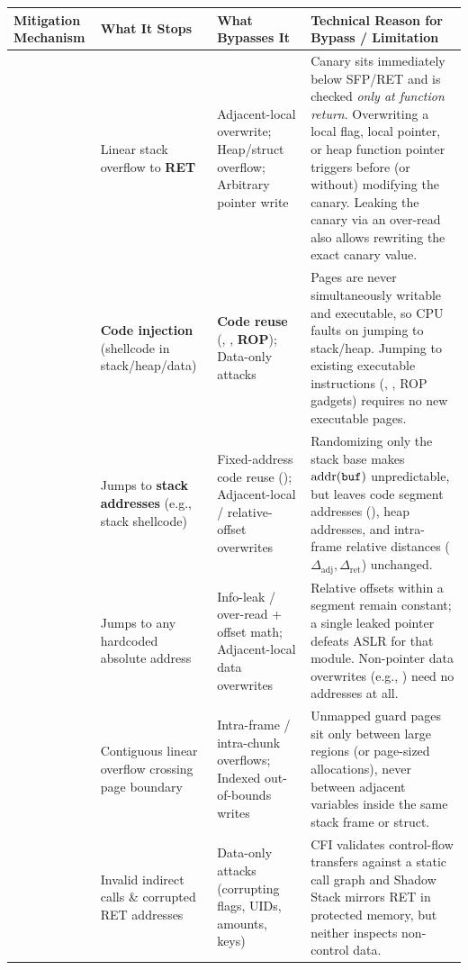 \begin{table}[h!]
\centering
\footnotesize
\begin{tabularx}{\textwidth}{@{}L{2.7cm} L{3.1cm} L{3.6cm} Y@{}}
\toprule
\textbf{Mitigation Mechanism} & \textbf{What It Stops} & \textbf{What Bypasses It} & \textbf{Technical Reason for Bypass / Limitation} \\
\midrule
{} & Linear stack overflow to \textbf{RET} & Adjacent-local overwrite; Heap/struct overflow; Arbitrary pointer write & Canary sits immediately below SFP/RET and is checked \emph{only at function return}. Overwriting a local flag, local pointer, or heap function pointer triggers before (or without) modifying the canary. Leaking the canary via an over-read also allows rewriting the exact canary value. \\
 & \textbf{Code injection} (shellcode in stack/heap/data) & \textbf{Code reuse} (, , \textbf{ROP}); Data-only attacks & Pages are never simultaneously writable and executable, so CPU faults on jumping to stack/heap. Jumping to existing executable instructions (, , ROP gadgets) requires no new executable pages. \\
 & Jumps to \textbf{stack addresses} (e.g., stack shellcode) & Fixed-address code reuse (); Adjacent-local / relative-offset overwrites & Randomizing only the stack base makes $\mathrm{addr}(\texttt{buf})$ unpredictable, but leaves code segment addresses (), heap addresses, and intra-frame relative distances ($\Delta_{\text{adj}}, \Delta_{\text{ret}}$) unchanged. \\
 & Jumps to any hardcoded absolute address & Info-leak / over-read + offset math; Adjacent-local data overwrites & Relative offsets within a segment remain constant; a single leaked pointer defeats ASLR for that module. Non-pointer data overwrites (e.g., ) need no addresses at all. \\
 & Contiguous linear overflow crossing page boundary & Intra-frame / intra-chunk overflows; Indexed out-of-bounds writes & Unmapped guard pages sit only between large regions (or page-sized allocations), never between adjacent variables inside the same stack frame or struct. \\
 & Invalid indirect calls \& corrupted RET addresses & Data-only attacks (corrupting flags, UIDs, amounts, keys) & CFI validates control-flow transfers against a static call graph and Shadow Stack mirrors RET in protected memory, but neither inspects non-control data. \\
\bottomrule
\end{tabularx}
\end{table}

